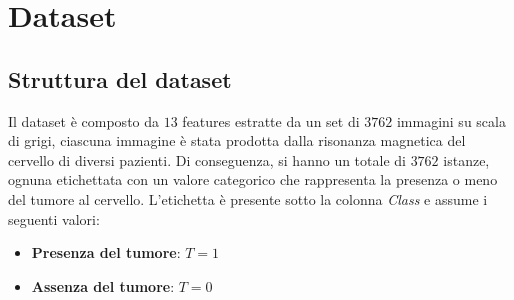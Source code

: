 \chapter{Dataset}
\section{Struttura del dataset}
Il dataset è composto da $13$ features estratte da un set di $3762$ immagini su
scala di grigi, ciascuna immagine è stata prodotta dalla risonanza magnetica del
cervello di diversi pazienti. Di conseguenza, si hanno un totale di $3762$
istanze, ognuna etichettata con un valore categorico che rappresenta la presenza
o meno del tumore al cervello. L'etichetta è presente sotto la colonna
\textit{Class} e assume i seguenti valori:
\begin{itemize}
      \item \textbf{Presenza del tumore}: $T = 1$
      \item \textbf{Assenza del tumore}: $T = 0$
\end{itemize}


